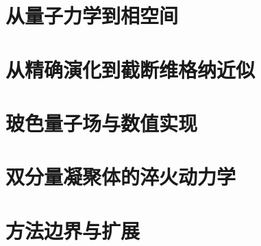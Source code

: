 \documentclass[UTF8,openany,12pt]{ctexbook}
\begin{document}
\frontmatter
\maketitle


\tableofcontents
\cleardoublepage
{}
{}
\listoffigures


\mainmatter

\part{从量子力学到相空间}





\part{从精确演化到截断维格纳近似}






\part{玻色量子场与数值实现}





\part{双分量凝聚体的淬火动力学}





\part{方法边界与扩展}


\appendix







\backmatter
{}
\begingroup
\raggedright


\endgroup
\end{document}
